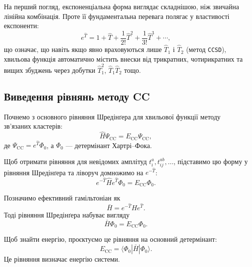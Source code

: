 На перший погляд, експоненціальна форма виглядає складнішою, ніж
звичайна лінійна комбінація. Проте її фундаментальна перевага полягає
у властивості експоненти:
\begin{equation}
    e^{\hat{T}} = 1 + \hat{T} + \frac{1}{2!}\hat{T}^2 +
    \frac{1}{3!}\hat{T}^3 + \cdots,
\end{equation}
що означає, що навіть якщо явно враховуються лише \(\hat{T}_1\) і \(\hat{T}_2\)
(метод \texttt{CCSD}), хвильова функція автоматично містить внески від
трикратних, чотирикратних та вищих збуджень через добутки
\(\hat{T}_1^2\), \(\hat{T}_1\hat{T}_2\) тощо.


\subsection{Виведення рівнянь методу CC}

Почнемо з основного рівняння Шредінґера для хвильової функції
методу зв'язаних кластерів:
\begin{equation}
    \hat{H} \Psi_{\text{CC}} = E_{\text{CC}} \Psi_{\text{CC}},
\end{equation}
де \(\Psi_{\text{CC}} = e^{\hat{T}} \Phi_0\), а \(\Phi_0\) --- детермінант Хартрі–Фока.

Щоб отримати рівняння для невідомих амплітуд \(t_i^a, t_{ij}^{ab}, \ldots\),
підставимо цю форму у рівняння Шредінґера та ліворуч домножимо на
\(e^{-\hat{T}}\):
\begin{equation}
    e^{-\hat{T}} \hat{H} e^{\hat{T}} \Phi_0 = E_{\text{CC}} \Phi_0.
\end{equation}

Позначимо ефективний гамільтоніан як
\begin{equation}
    \bar{H} = e^{-\hat{T}} \hat{H} e^{\hat{T}}.
\end{equation}
Тоді рівняння Шредінґера набуває вигляду
\[
\bar{H} \Phi_0 = E_{\text{CC}} \Phi_0.
\]

Щоб знайти енергію, проєктуємо це рівняння на основний детермінант:
\begin{equation}
    E_{\text{CC}} = \langle \Phi_0 | \bar{H} | \Phi_0 \rangle.
\end{equation}
Це рівняння визначає енергію системи.

